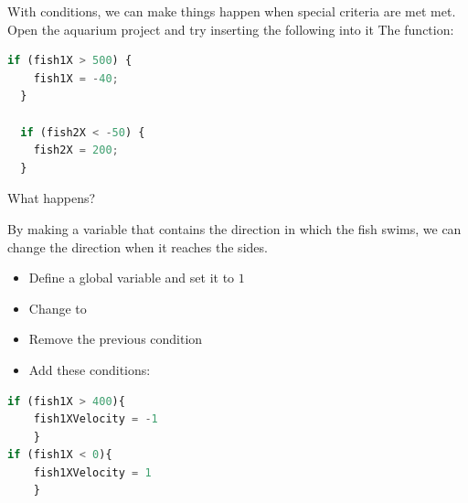 \newpage
{}
\begin{exercisebox}[adjusted title= Conditionals]
With conditions, we can make things happen when special criteria are met
met. Open the aquarium project and try inserting the following into it
The  function:


\begin{lstlisting}[language=JavaScript]
if (fish1X > 500) {
    fish1X = -40;
  }

  if (fish2X < -50) {
    fish2X = 200;
  }
\end{lstlisting}

\noindent
What happens?
\end{exercisebox}

\begin{exercisebox}[adjusted title= Change direction]
By making a variable that contains the direction in which the fish swims, we can change the direction when it reaches the sides.

\begin{itemize}
\item Define a global variable  and set it to $1$
\item Change  to 
\item Remove the previous  condition
\item Add these conditions:
\end{itemize}


\begin{lstlisting}[language=JavaScript]
if (fish1X > 400){
    fish1XVelocity = -1
    }
if (fish1X < 0){
    fish1XVelocity = 1
    }
\end{lstlisting}
\end{exercisebox}

